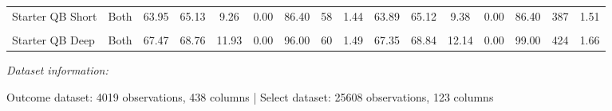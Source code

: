 \documentclass[
]{article}
\begin{document}
\begin{table}[!h]
{\begin{threeparttable}
\begin{tabular}[t]{lccccccccccccccc}
Starter QB Short & Both & 63.95 & 65.13 & 9.26 & 0.00 & 86.40 & 58 & 1.44 & 63.89 & 65.12 & 9.38 & 0.00 & 86.40 & 387 & 1.51\\
\cellcolor{gray!10}{Starter QB Medium} & \cellcolor{gray!10}{Both} & \cellcolor{gray!10}{66.35} & \cellcolor{gray!10}{67.70} & \cellcolor{gray!10}{11.16} & \cellcolor{gray!10}{0.00} & \cellcolor{gray!10}{94.50} & \cellcolor{gray!10}{57} & \cellcolor{gray!10}{1.42} & \cellcolor{gray!10}{66.36} & \cellcolor{gray!10}{67.89} & \cellcolor{gray!10}{11.41} & \cellcolor{gray!10}{0.00} & \cellcolor{gray!10}{94.50} & \cellcolor{gray!10}{395} & \cellcolor{gray!10}{1.54}\\
\addlinespace
Starter QB Deep & Both & 67.47 & 68.76 & 11.93 & 0.00 & 96.00 & 60 & 1.49 & 67.35 & 68.84 & 12.14 & 0.00 & 99.00 & 424 & 1.66\\
\bottomrule
\end{tabular}
\begin{tablenotes}[para]
\item \textit{Dataset information: } 
\item Outcome dataset: 4019 observations, 438 columns | Select dataset: 25608 observations, 123 columns
\end{tablenotes}
\end{threeparttable}}
\end{table}
\end{document}
